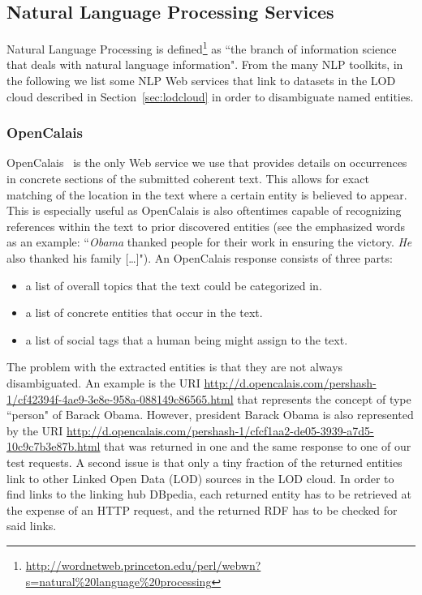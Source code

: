 \documentclass[twocolumn]{article}
\begin{document}
\subsection{Natural Language Processing Services}\label{sec:nlp-services}
Natural Language Processing is defined\footnote{\url{http://wordnetweb.princeton.edu/perl/webwn?s=natural\%20language\%20processing}} as ``the branch of information science that deals with natural language information". From the many NLP toolkits, in the following we list some NLP Web services that link to datasets in the LOD cloud described in Section~\ref{sec:lodcloud} in order to disambiguate named entities.

\subsubsection{OpenCalais}\label{sec:opencalais}
OpenCalais~\cite{OpenCalais} is the only Web service we use that provides details on occurrences in concrete sections of the submitted coherent text. This allows for exact matching of the location in the text where a certain entity is believed to appear. This is especially useful as OpenCalais is also oftentimes capable of recognizing references within the text to prior discovered entities (see the emphasized words as an example: ``\emph{Obama} thanked people for their work in ensuring the victory. \emph{He} also thanked his family […]"). An OpenCalais response consists of three parts:

\begin{itemize}
\item a list of overall topics that the text could be categorized in.
\item a list of concrete entities that occur in the text.
\item a list of social tags that a human being might assign to the text.
\end{itemize}

The problem with the extracted entities is that they are not always disambiguated. An example is the URI \url{http://d.opencalais.com/pershash-1/cf42394f-4ae9-3e8e-958a-088149c86565.html} that represents the concept of type ``person" of Barack Obama. However, president Barack Obama is also represented by the URI \url{http://d.opencalais.com/pershash-1/cfcf1aa2-de05-3939-a7d5-10c9c7b3e87b.html} that was returned in one and the same response to one of our test requests. A second issue is that only a tiny fraction of the returned entities link to other Linked Open Data (LOD) sources in the LOD cloud. In order to find links to the linking hub DBpedia, each returned entity has to be retrieved at the expense of an HTTP request, and the returned RDF has to be checked for said links.
\end{document}
